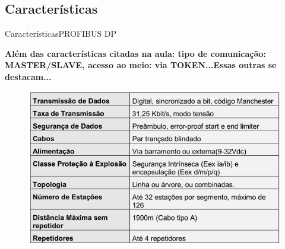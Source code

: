 \documentclass{beamer}
\begin{document}
\subsection{Características}

\begin{frame}{Características}{PROFIBUS DP}

	\begin{scriptsize}
	\textbf{Além das características citadas na aula: tipo de comunicação: MASTER/SLAVE, acesso ao meio: via TOKEN...Essas outras se destacam...}
	\end{scriptsize}		
	
	\begin{figure}
	\centering
	\includegraphics[scale=0.4]{figs/caracteristicas}
	\end{figure}

\end{frame}
\end{document}
